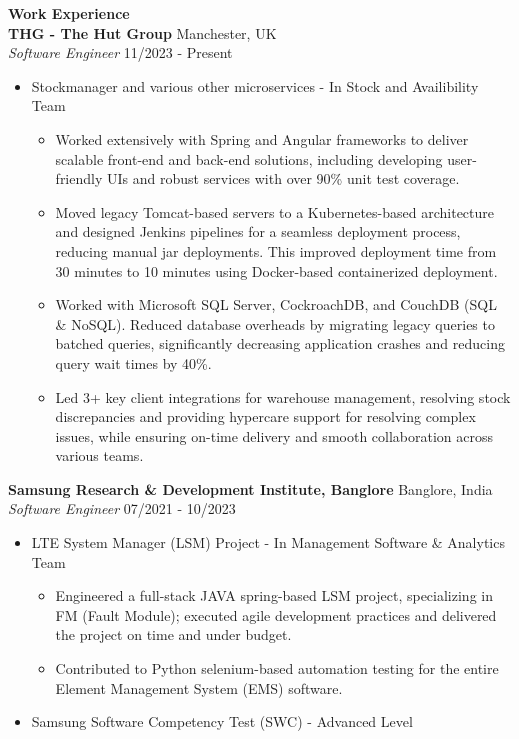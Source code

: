 \documentclass{article}
\begin{document}
\noindent \large \textbf{\textcolor{NavyBlue}{Work Experience}} \vspace{3pt} \\
\noindent \normalsize \textbf{THG - The Hut Group} \hfill Manchester, UK \\
\textit{Software Engineer} \hfill 11/2023 - Present
\begin{itemize}[noitemsep,nolistsep,leftmargin=*]
    \item {\normalsize {Stockmanager and various other microservices - In Stock and Availibility Team }
        \begin{itemize}
            \item Worked extensively with Spring and Angular frameworks to deliver scalable front-end and back-end solutions, including developing user-friendly UIs and robust services with over 90\% unit test coverage.
            \item Moved legacy Tomcat-based servers to a Kubernetes-based architecture and designed Jenkins pipelines for a seamless deployment process, reducing manual jar deployments. This improved deployment time from 30 minutes to 10 minutes using Docker-based containerized deployment.
            \item Worked with Microsoft SQL Server, CockroachDB, and CouchDB (SQL \& NoSQL). Reduced database overheads by migrating legacy queries to batched queries, significantly decreasing application crashes and reducing query wait times by 40\%.
            \item Led 3+ key client integrations for warehouse management, resolving stock discrepancies and providing hypercare support for resolving complex issues, while ensuring on-time delivery and smooth collaboration across various teams.
        \end{itemize}
    }
\end{itemize}
\noindent \normalsize \textbf{Samsung Research \& Development Institute, Banglore} \hfill Banglore, India  \\
\textit{Software Engineer} \hfill 07/2021 - 10/2023
\begin{itemize}[noitemsep,nolistsep,leftmargin=*]
    \item {\normalsize {LTE System Manager (LSM) Project - In Management Software \& Analytics Team }
        \begin{itemize}
            \item Engineered a full-stack JAVA spring-based LSM project, specializing in FM (Fault Module); executed agile development practices and delivered the project on time and under budget.
            \item Contributed to Python selenium-based automation testing for the entire Element Management System (EMS) software.
        \end{itemize}
    }
    \item {\normalsize {Samsung Software Competency Test (SWC) - Advanced Level}}
\end{itemize}
\end{document}
